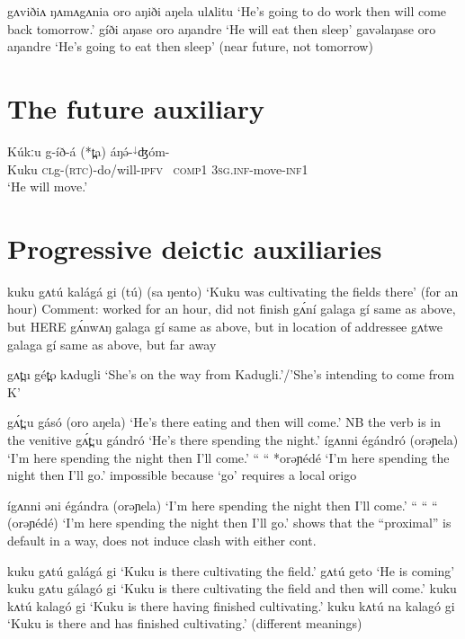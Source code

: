 gʌviðiʌ ŋʌmʌgʌnia oro aŋiði aŋela ulʌlitu	
‘He’s going to do work then will come back tomorrow.’
gíði aŋase oro aŋandre		‘He will eat then sleep’
gavəlaŋase oro aŋandre	‘He’s going to eat then sleep’ (near future, not tomorrow)



\section{The future auxiliary}

\ea \gll Kúkːu g-íð-á (*t̪a) áŋə́-$^{↓}$ʤóm-\\
Kuku \textsc{cl}g-(\textsc{rtc})-do/will-\textsc{ipfv} {\ \textsc{comp1}} \textsc{3sg.inf}-move-\textsc{inf1}\\
\glt ‘He will move.’
\z 




\section{Progressive deictic auxiliaries}\label{sec:ch14:progaux}

kuku gʌtú kalágá gi (tú) (sa ŋento)	‘Kuku was cultivating the fields there’ (for an hour)
			Comment: worked for an hour, did not finish
gʌ́ní galaga gí				same as above, but HERE
gʌ́nwʌŋ galaga gí			same as above, but in location of addressee
gʌtwe galaga gí			same as above, but far away

gʌt̪u gét̪o kʌdugli	‘She’s on the way from Kadugli.’/’She’s intending to come from K’

gʌ́t̪:u gásó (oro aŋela)		‘He’s there eating and then will come.’
 NB the verb is in the venitive
gʌ́t̪:u gándró			‘He’s there spending the night.’
ígʌnni égándró (orəɲela)	‘I’m here spending the night then I’ll come.'
 “	“	*orəɲédé	‘I’m here spending the night then I’ll go.'	
 impossible because ‘go’ requires a local origo

ígʌnni əni égándra (orəɲela)	‘I’m here spending the night then I’ll come.'
“ 	“	“     (orəɲédé)	‘I’m here spending the night then I’ll go.'
 shows that the “proximal” is default in a way, does not induce clash with either cont.


kuku gʌtú galágá gi			‘Kuku is there cultivating the field.’
gʌtú geto				‘He is coming’
kuku gʌtu gálagó gi			‘Kuku is there cultivating the field and then will come.’
kuku kʌtú kalagó gi			‘Kuku is there having finished cultivating.’
kuku kʌtú na kalagó gi		‘Kuku is there and has finished cultivating.’ 
(different meanings)

